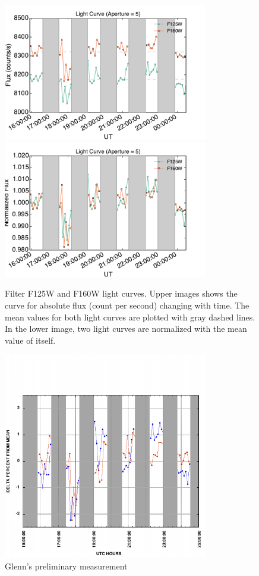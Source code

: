 \documentclass[paper=letter, fontsize=11pt]{scrartcl} %
\numberwithin{equation}{section} %
\numberwithin{figure}{section} %
\numberwithin{table}{section} %
\begin{document}
\begin{figure}
  \centering
  \includegraphics[width=0.8\textwidth]{fluxcurve_aper_05}
  \includegraphics[width=0.8\textwidth]{relativefluxcurve_aper_05}
  \caption{Filter F125W and F160W light curves. Upper images shows the
    curve for absolute flux (count per second) changing with time. The
    mean values for both light curves are plotted with gray dashed
    lines. In the lower image, two light curves are normalized with
    the mean value of itself.}
  \label{fig:lightcurve}
\end{figure}

\begin{figure}
  \centering
    \centering
    \includegraphics[width=0.8\textwidth]{ABPIC_DELTA_PERCENT_INITIAL}
    \caption{Glenn's preliminary measurement}
    \label{fig:glenn}
  \end{figure}
\end{document}
